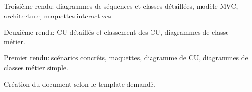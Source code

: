 \bgroup\tfxx
{}

Troisième rendu: diagrammes de séquences et classes détaillées, modèle MVC, architecture, maquettes interactives.

Deuxième rendu: CU détaillés et classement des CU, diagrammes de classe métier.

Premier rendu: scénarios concrêts, maquettes, diagramme de CU, diagrammes de classes métier simple.

Création du document selon le template demandé.
\par
\egroup

